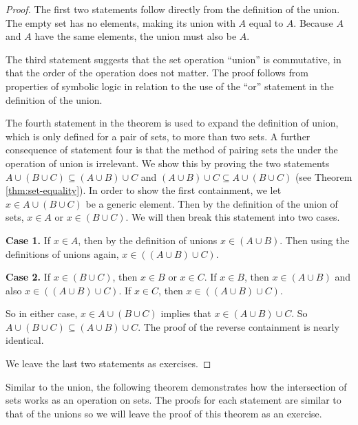 \documentclass[
]{book}
\theoremstyle{definition}
\theoremstyle{definition}
\theoremstyle{definition}
\theoremstyle{definition}
\theoremstyle{remark}
\begin{document}
\begin{proof}

The first two statements follow directly from the definition of the union. The empty set has no elements, making its union with \(A\) equal to \(A\). Because \(A\) and \(A\) have the same elements, the union must also be \(A\).

The third statement suggests that the set operation ``union'' is commutative, in that the order of the operation does not matter. The proof follows from properties of symbolic logic in relation to the use of the ``or'' statement in the definition of the union.

The fourth statement in the theorem is used to expand the definition of union, which is only defined for a pair of sets, to more than two sets. A further consequence of statement four is that the method of pairing sets the under the operation of union is irrelevant. We show this by proving the two statements \(A \cup (B\cup C ) \subseteq (A\cup B) \cup C\) and \((A\cup B) \cup C \subseteq A \cup (B\cup C)\) (see Theorem \ref{thm:set-equality}). In order to show the first containment, we let \(x\in A \cup (B\cup C )\) be a generic element. Then by the definition of the union of sets, \(x\in A\) or \(x\in (B\cup C)\). We will then break this statement into two cases.

\textbf{Case 1.} If \(x\in A\), then by the definition of unions \(x\in (A \cup B)\). Then using the definitions of unions again, \(x \in ((A \cup B) \cup C)\).

\textbf{Case 2.} If \(x\in (B\cup C)\), then \(x\in B\) or \(x\in C\). If \(x\in B\), then \(x\in (A\cup B)\) and also \(x\in ((A\cup B) \cup C)\). If \(x\in C\), then \(x\in ((A\cup B) \cup C)\).

So in either case, \(x \in A \cup (B\cup C)\) implies that \(x\in (A\cup B) \cup C\). So \(A\cup (B\cup C) \subseteq (A\cup B)\cup C\). The proof of the reverse containment is nearly identical.

We leave the last two statements as exercises.

\end{proof}

Similar to the union, the following theorem demonstrates how the intersection of sets works as an operation on sets. The proofs for each statement are similar to that of the unions so we will leave the proof of this theorem as an exercise.
\end{document}
